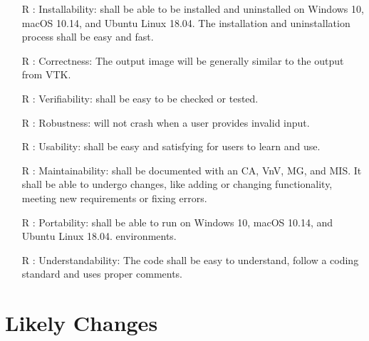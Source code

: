 \documentclass[12pt]{article}
\begin{document}
\begin{itemize}
\item[R\refstepcounter{reqnum}\thereqnum
\label{R_install}:]
Installability: \famname{} shall be able to be installed and uninstalled on
Windows 10, macOS 10.14, and Ubuntu Linux 18.04. The installation and
uninstallation process shall be easy and fast. 
\item[R\refstepcounter{reqnum}\thereqnum
\label{R_correct}:]
Correctness: The output image will be generally similar to the output from VTK.
\item[R\refstepcounter{reqnum}\thereqnum
\label{R_verify}:]
Verifiability: \famname{} shall be easy to be checked or tested.
\item[R\refstepcounter{reqnum}\thereqnum
\label{R_robust}:]
Robustness: \famname{} will not crash when a user provides invalid input.
\item[R\refstepcounter{reqnum}\thereqnum
\label{R_use}:]
Usability: \famname{} shall be easy and satisfying for users to learn and use.
\item[R\refstepcounter{reqnum}\thereqnum
\label{R_maintain}:]
Maintainability: \famname{} shall be documented with an CA, VnV, MG, and MIS. It shall be able to undergo changes, like adding or changing functionality, meeting new requirements or fixing errors.
\item[R\refstepcounter{reqnum}\thereqnum
\label{R_portal}:]
Portability: \famname{} shall be able to run on Windows 10, macOS 10.14, and Ubuntu Linux 18.04.
environments.
\item[R\refstepcounter{reqnum}\thereqnum
\label{R_understand}:]
Understandability: The code shall be easy to understand, follow a coding standard and uses proper comments.
\end{itemize}

\section{Likely Changes}    
\end{document}
